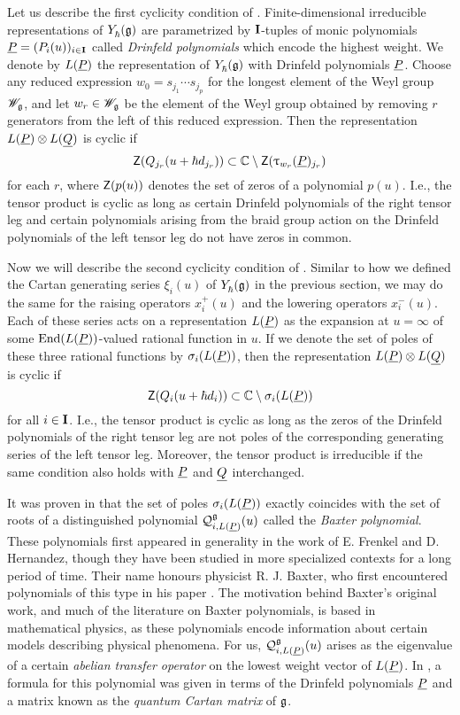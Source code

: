 Let us describe the first cyclicity condition of \cite{tan_braid_2015}.
Finite-dimensional irreducible representations of $Y_\hbar^{}(\mathfrak{g})$ are parametrized by $\mathbf{I}$-tuples of monic polynomials $\underline{P}=(P_i(u))_{i\in\mathbf{I}}$ called \emph{Drinfeld polynomials} which encode the highest weight.
We denote by $L(\underline{P})$ the representation of $Y_\hbar^{}(\mathfrak{g})$ with Drinfeld polynomials $\underline{P}$.
Choose any reduced expression $w_0 = s_{j_1}\cdots s_{j_p}$ for the longest element of the Weyl group $\mathscr{W}_{\mathfrak{g}}$, and let $w_r\in\mathscr{W}_{\mathfrak{g}}$ be the element of the Weyl group obtained by removing $r$ generators from the left of this reduced expression.
Then the representation $L(\underline{P})\otimes L(\underline{Q})$ is cyclic if
\[\mathsf{Z}(Q_{j_r}(u+\hbar d_{j_r}))\subset\mathbb{C}\setminus\mathsf{Z}(\uptau_{w_r}(\underline{P})_{j_r})\]
for each $r$, where $\mathsf{Z}(p(u))$ denotes the set of zeros of a polynomial $p(u)$.
I.e., the tensor product is cyclic as long as certain Drinfeld polynomials of the right tensor leg and certain polynomials arising from the braid group action on the Drinfeld polynomials of the left tensor leg do not have zeros in common.

Now we will describe the second cyclicity condition of \cite{gautam_poles_2023}.
Similar to how we defined the Cartan generating series $\xi_i(u)$ of $Y_\hbar^{}(\mathfrak{g})$ in the previous section, we may do the same for the raising operators $x^+_i(u)$ and the lowering operators $x^-_i(u)$.
Each of these series acts on a representation $L(\underline{P})$ as the expansion at $u=\infty$ of some $\operatorname{End}(L(\underline{P}))$-valued rational function in $u$.
If we denote the set of poles of these three rational functions by $\sigma_i(L(\underline{P}))$, then the representation $L(\underline{P})\otimes L(\underline{Q})$ is cyclic if
\[\mathsf{Z}(Q_i(u+\hbar d_i))\subset\mathbb{C}\setminus\sigma_i(L(\underline{P}))\]
for all $i\in\mathbf{I}$.
I.e., the tensor product is cyclic as long as the zeros of the Drinfeld polynomials of the right tensor leg are not poles of the corresponding generating series of the left tensor leg.
Moreover, the tensor product is irreducible if the same condition also holds with $\underline{P}$ and $\underline{Q}$ interchanged.

It was proven in \cite{gautam_poles_2023} that the set of poles $\sigma_i(L(\underline{P}))$ exactly coincides with the set of roots of a distinguished polynomial $\mathcal{Q}_{i,L(\underline{P})}^{\mathfrak{g}}(u)$ called the \emph{Baxter polynomial}.
These polynomials first appeared in generality in the work \cite{frenkel_baxters_2015} of E. Frenkel and D. Hernandez, though they have been studied in more specialized contexts for a long period of time.
Their name honours physicist R. J. Baxter, who first encountered polynomials of this type in his paper \cite{baxter_partition_1972}.
The motivation behind Baxter's original work, and much of the literature on Baxter polynomials, is based in mathematical physics, as these polynomials encode information about certain models describing physical phenomena.
For us, $\mathcal{Q}_{i,L(\underline{P})}^{\mathfrak{g}}(u)$ arises as the eigenvalue of a certain \emph{abelian transfer operator} on the lowest weight vector of $L(\underline{P})$.
In \cite{gautam_poles_2023}, a formula for this polynomial was given in terms of the Drinfeld polynomials $\underline{P}$ and a matrix known as the \emph{quantum Cartan matrix} of $\mathfrak{g}$.

